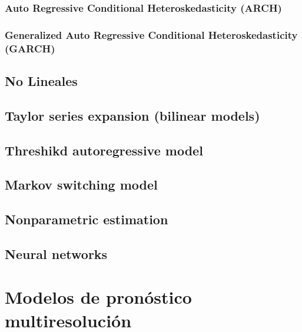 \subsubsection{Auto Regressive Conditional Heteroskedasticity (ARCH)}
\subsubsection{Generalized Auto Regressive Conditional Heteroskedasticity (GARCH)}

\subsection{No Lineales}
\subsection{Taylor series expansion (bilinear models)}
\subsection{Threshikd autoregressive model}
\subsection{Markov switching model}
\subsection{Nonparametric estimation}
\subsection{Neural networks}

\section{Modelos de pronóstico multiresolución}
